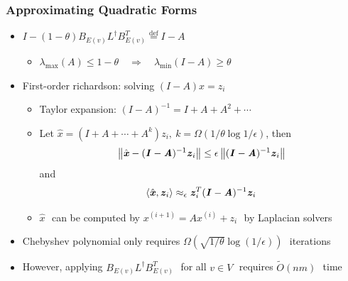 \documentclass[12pt]{beamer}
\def\defeq{\stackrel{\mathrm{def}}{=}}
\def\eps{\epsilon}
\def\norm#1{\left\| #1 \right\|}
\newcommand\zz{\boldsymbol{\mathit{z}}}
\newcommand\xx{\boldsymbol{\mathit{x}}}
\renewcommand\AA{\boldsymbol{\mathit{A}}}
\newcommand\BB{\boldsymbol{\mathit{B}}}
\newcommand\II{\boldsymbol{\mathit{I}}}
\newcommand\LL{\boldsymbol{\mathit{L}}}
\begin{document}
\begin{spacing}{1.3}
\begin{frame}
	\frametitle{Approximating Quadratic Forms}
	\vspace{5pt}
	\begin{itemize}
		\item \footnotesize \scriptsize$\II - (1 - \theta)\BB_{E(v)}\LL^\dag \BB_{E(v)}^T \defeq \II - \AA$\,\footnotesize\ 
			\vspace{2.5pt}
			\begin{itemize}
				\item \scriptsize$\lambda_{\mathrm{max}}(\AA) \leq 1 - \theta \quad \Rightarrow \quad \lambda_{\mathrm{min}}(\II - \AA) \geq \theta$\footnotesize
			\end{itemize}
		\item \footnotesize First-order richardson: solving \scriptsize$(\II - \AA)\xx = \zz_i$\,\footnotesize\ %
		\begin{itemize}
			\item \footnotesize Taylor expansion: \scriptsize$(\II - \AA)^{-1} = \II + \AA + \AA^2 + \cdots$\footnotesize
			\item Let \scriptsize$\hat{\xx} = (\II + \AA + \cdots + \AA^k)\zz_i,\ k = \Omega(1 / \theta \log 1/\eps)$\footnotesize, then
			\scriptsize
			\vspace{-7.5pt}
			\[
				\vspace{-5pt}
				\norm{\hat{\xx} - (\II - \AA)^{-1}\zz_i} \leq \eps \norm{(\II - \AA)^{-1} \zz_i}
			\]
			\footnotesize
			and
			\scriptsize
			\vspace{-5pt}
			\[
				\vspace{-5pt}
				\langle \hat{\xx}, \zz_i \rangle \approx_{\eps} \zz_i^T (\II - \AA)^{-1} \zz_i
			\]
			\footnotesize
			\item \scriptsize$\hat{\xx}$\,\footnotesize\ can be computed by \scriptsize$\xx^{(i+1)} = \AA \xx^{(i)} + \zz_i$\,\footnotesize\ by Laplacian solvers
		\end{itemize}
		\item \footnotesize Chebyshev polynomial only requires \scriptsize$\Omega(\sqrt{1/\theta}\log(1/\eps))$\,\footnotesize\ iterations
		\item However, applying \scriptsize$\BB_{E(v)}\LL^\dag \BB_{E(v)}^T$\,\footnotesize\ for all
			\scriptsize$v \in V$\,\footnotesize\ requires \scriptsize$\widetilde{O}(nm)$\,\footnotesize\ time
	\end{itemize}
\end{frame}


\end{spacing}
\end{document}

